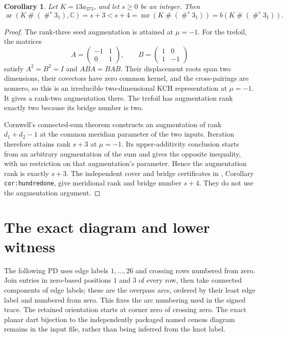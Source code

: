 \documentclass[11pt]{article}
\newtheorem{corollary}[theorem]{Corollary}
\begin{document}
\begin{corollary}\label{cor:sums}
Let $K=13a_{373}$, and let $s\ge0$ be an integer. Then
\[
 \operatorname{ar}(K\mathbin{\#}(\mathbin{\#}^{s}3_1),\mathbb C)
 =s+3<s+4
 =\operatorname{mr}(K\mathbin{\#}(\mathbin{\#}^{s}3_1))
 =b(K\mathbin{\#}(\mathbin{\#}^{s}3_1)).
\]
\end{corollary}
\begin{proof}
The rank-three seed augmentation is attained at $\mu=-1$.
For the trefoil, the matrices
\[
 A=\begin{pmatrix}-1&1\\0&1\end{pmatrix},\qquad
 B=\begin{pmatrix}1&0\\1&-1\end{pmatrix}
\]
satisfy $A^2=B^2=I$ and $ABA=BAB$. Their displacement roots span
two dimensions, their covectors have zero common kernel, and the
cross-pairings are nonzero, so this is an irreducible two-dimensional
KCH representation at $\mu=-1$. It gives a rank-two augmentation
there. The trefoil has augmentation rank exactly two because its
bridge number is two.

Cornwell's connected-sum theorem \cite[Theorem1.9, proof in Section4.2]{cornwell17}
constructs an augmentation of rank $d_1+d_2-1$ at the common meridian
parameter of the two inputs. Iteration therefore attains rank $s+3$
at $\mu=-1$. Its upper-additivity conclusion starts from an arbitrary
augmentation of the sum and gives the opposite inequality, with no
restriction on that augmentation's parameter. Hence the augmentation
rank is exactly $s+3$. The independent cover and bridge certificates in
, Corollary \texttt{cor:hundredone},
give meridional rank and bridge number $s+4$. They do not use the
augmentation argument.
\end{proof}

\section*{The exact diagram and lower witness}
The following PD uses edge labels $1,\ldots,26$ and crossing rows
numbered from zero. Join entries in zero-based positions $1$ and $3$
of every row, then take connected components of edge labels; these are
the overpass arcs, ordered by their least edge label and numbered from
zero. This fixes the arc numbering used in the signed trace.
The retained orientation starts at corner zero of crossing zero.
The exact planar dart bijection to the independently packaged named
census diagram remains in the input file, rather than being inferred
from the knot label.
\end{document}
